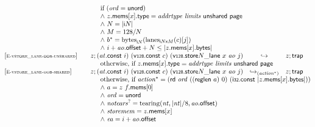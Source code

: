 $$\begin{array}[t]{@{}lrcl@{}l@{}}
& \multicolumn{4}{@{}l@{}}{\quad
\quad
\begin{array}[t]{@{}l@{}}
\mbox{if}~ ({\mathit{ord}} = \mathsf{unord}) \\
{\land}~ z{.}\mathsf{mems}{}[x]{.}\mathsf{type} = {\mathit{addrtype}}~{\mathit{limits}}~\mathsf{unshared}~\mathsf{page} \\
{\land}~ N = {|{\mathsf{i}}{N}|} \\
{\land}~ M = 128 / N \\
{\land}~ {b^\ast} = {{\mathrm{bytes}}}_{{\mathsf{i}}{N}}({{\mathrm{lanes}}}_{{{\mathsf{i}}{N}}{\mathsf{x}}{M}}(c){}[j]) \\
{\land}~ i + {\mathit{ao}}{.}\mathsf{offset} + N \leq {|z{.}\mathsf{mems}{}[x]{.}\mathsf{bytes}|} \\
\end{array}
} \\
{[\textsc{\scriptsize E{-}vstore\_lane{-}oob{-}unshared}]} \quad & z ; ({\mathit{at}}{.}\mathsf{const}~i)~(\mathsf{v{\scriptstyle 128}}{.}\mathsf{const}~c)~({\mathsf{v{\scriptstyle 128}}{.}\mathsf{store}}{N}{\mathsf{\_}}{\mathsf{lane}}~x~{\mathit{ao}}~j) & \hookrightarrow & z ; \mathsf{trap} &  \\
& \multicolumn{4}{@{}l@{}}{\quad
\quad \mbox{otherwise, if}~ z{.}\mathsf{mems}{}[x]{.}\mathsf{type} = {\mathit{addrtype}}~{\mathit{limits}}~\mathsf{unshared}~\mathsf{page}
} \\
{[\textsc{\scriptsize E{-}vstore\_lane{-}oob{-}shared}]} \quad & z ; ({\mathit{at}}{.}\mathsf{const}~i)~(\mathsf{v{\scriptstyle 128}}{.}\mathsf{const}~c)~({\mathsf{v{\scriptstyle 128}}{.}\mathsf{store}}{N}{\mathsf{\_}}{\mathsf{lane}}~x~{\mathit{ao}}~j) & {\hookrightarrow}_{({{\mathit{action}}^\ast})} {} & z ; \mathsf{trap} &  \\
& \multicolumn{4}{@{}l@{}}{\quad
\quad
\begin{array}[t]{@{}l@{}}
\mbox{otherwise, if}~ {{\mathit{action}}^\ast} = (\mathsf{rd}~{\mathit{ord}}~((\mathsf{reglen}~a)~0)~(\mathsf{i{\scriptstyle 32}}{.}\mathsf{const}~{|z{.}\mathsf{mems}{}[x]{.}\mathsf{bytes}|})) \\
{\land}~ a = z~f{.}\mathsf{mems}{}[0] \\
{\land}~ {\mathit{ord}} = \mathsf{unord} \\
{\land}~ {{\mathit{notears}}^?} = {\mathrm{tearing}}({\mathit{nt}}, {|{\mathit{nt}}|} / 8, {\mathit{ao}}{.}\mathsf{offset}) \\
{\land}~ {\mathit{storemem}} = z{.}\mathsf{mems}{}[x] \\
{\land}~ {\mathit{ea}} = i + {\mathit{ao}}{.}\mathsf{offset} \\

\end{array}}
\end{array}$$
